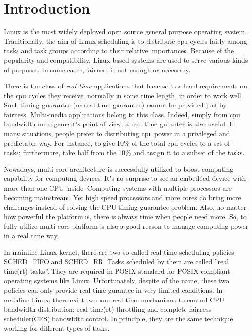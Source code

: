 \chapter{Introduction\label{chap:introduction}}

Linux is the most widely deployed open source general purpose
operating system. Traditionally, the aim of Linux scheduling is to
distribute cpu cycles fairly among tasks and task groups according to
their relative importances. Because of the popularity and
compatibility, Linux based systems are used to serve various kinds of
purposes. In some cases, fairness is not enough or necessary.

There is the class of \emph{real time} applications 
that have soft or hard requirements on the cpu cycles they receive,
normally in some time length, in order to work well. Such timing
guarantee (or real time guarantee) cannot be provided just by fairness. 
Multi-media applications belong to this class. Indeed, simply from cpu 
bandwidth management's point of view, a real time gurantee is also 
useful. In many situations, people prefer to distributing cpu power in 
a privileged and predictable way. For instance, to give 10\% of the 
total cpu cycles to a set of tasks; furthermore, take half from the 10\% 
and assign it to a subset of the tasks.

Nowadays, multi-core architecture is successfully utilized to boost 
computing capability for computing devices. It's no surprise to see an 
embedded device with more than one CPU inside. Computing systems with 
multiple processors are becoming mainstream. Yet high speed processors 
and more cores do bring more challenges instead of solving the CPU timing 
guarantee problem. Also, no matter how powerful the platform is, there is 
always time when people need more. So, to fully utilize multi-core platform 
is also a good reason to manage computing power in a real time way. 

In mainline Linux kernel, there are two so called real time scheduling 
policies SCHED\_FIFO and SCHED\_RR. Tasks scheduled by them are called 
''real time(rt) tasks''. They are required in POSIX standard for 
POSIX-compliant operating systems like Linux. Unfortunately, despite of 
the name, these two policies can only provide real time gurantee in very 
limited conditions. In mainline Linux, there exist two non real time 
mechanisms to control CPU bandwidth distribution: real time(rt) throttling 
and complete fairness scheduler(CFS) bandwidth control. In principle, they 
are the same technique working for different types of tasks.

